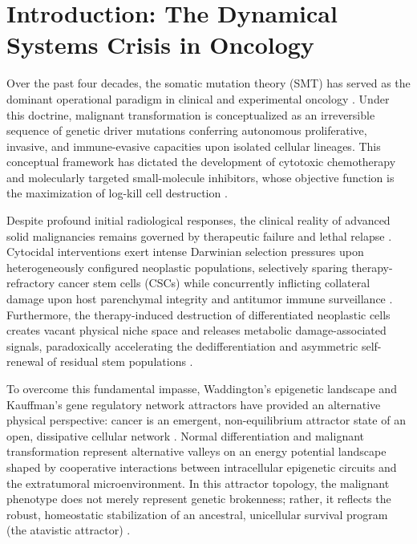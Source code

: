 \documentclass[11pt,a4paper]{article}
\begin{document}
\section{Introduction: The Dynamical Systems Crisis in Oncology}

Over the past four decades, the somatic mutation theory (SMT) has served as the dominant operational paradigm in clinical and experimental oncology \cite{Hanahan2011,Weinberg2014}. Under this doctrine, malignant transformation is conceptualized as an irreversible sequence of genetic driver mutations conferring autonomous proliferative, invasive, and immune-evasive capacities upon isolated cellular lineages. This conceptual framework has dictated the development of cytotoxic chemotherapy and molecularly targeted small-molecule inhibitors, whose objective function is the maximization of log-kill cell destruction \cite{GoldieColdman1979}.

Despite profound initial radiological responses, the clinical reality of advanced solid malignancies remains governed by therapeutic failure and lethal relapse \cite{Holohan2013,DagogoJack2018}. Cytocidal interventions exert intense Darwinian selection pressures upon heterogeneously configured neoplastic populations, selectively sparing therapy-refractory cancer stem cells (CSCs) while concurrently inflicting collateral damage upon host parenchymal integrity and antitumor immune surveillance \cite{Dean2005,Kreso2014}. Furthermore, the therapy-induced destruction of differentiated neoplastic cells creates vacant physical niche space and releases metabolic damage-associated signals, paradoxically accelerating the dedifferentiation and asymmetric self-renewal of residual stem populations \cite{Gupta2019,Plaks2015}.

To overcome this fundamental impasse, Waddington's epigenetic landscape and Kauffman's gene regulatory network attractors have provided an alternative physical perspective: cancer is an emergent, non-equilibrium attractor state of an open, dissipative cellular network \cite{Waddington1957,Kauffman1993,Huang2009,Wang2014}. Normal differentiation and malignant transformation represent alternative valleys on an energy potential landscape shaped by cooperative interactions between intracellular epigenetic circuits and the extratumoral microenvironment. In this attractor topology, the malignant phenotype does not merely represent genetic brokenness; rather, it reflects the robust, homeostatic stabilization of an ancestral, unicellular survival program (the atavistic attractor) \cite{Lineweaver2011,Davies2012}.
\end{document}
